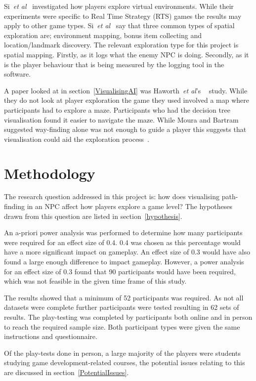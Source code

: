 \documentclass[journal]{IEEEtran}
\begin{document}
	Si~\textit{et al}~\cite{si2017} investigated how players explore virtual environments. While their experiments were specific to Real Time Strategy (RTS) games the results may apply to other game types. Si~\textit{et al}~\cite{si2017} say that three common types of spatial exploration are; environment mapping, bonus item collecting and location/landmark discovery. The relevant exploration type for this project is spatial mapping. Firstly, as it logs what the enemy NPC is doing.  Secondly, as it is the player behaviour that is being measured by the logging tool in the software.
	
	A paper looked at in section~\ref{VisualisingAI} was Haworth~\textit{et al}'s ~\cite{Haworth2010} study. While they do not look at player exploration the game they used involved a map where participants had to explore a maze. Participants who had the decision tree visualisation found it easier to navigate the maze. While Moura and Bartram~\cite{moura2014} suggested way-finding alone was not enough to guide a player this suggests that visualisation could aid the exploration process~\cite{Haworth2010}.
	
	\section{Methodology} \label{methodology}
	The research question addressed in this project is: how does visualising path-finding in an NPC affect how players explore a game level? The hypotheses drawn from this question are listed in section~\ref{hypothesis}.  
	
	An a-priori power analysis was performed to determine how many participants were required for an effect size of 0.4. 0.4 was chosen as this percentage would have a more significant impact on gameplay.  An effect size of 0.3 would have also found a large enough difference to impact gameplay. However, a power analysis for an effect size of 0.3 found that 90 participants would have been required, which was not feasible in the given time frame of this study.
	
	The results showed that a minimum of 52 participants was required. As not all datasets were complete further participants were tested resulting in 62 sets of results. The play-testing was completed by participants both online and in person to reach the required sample size. Both participant types were given the same instructions and questionnaire. 
	
	Of the play-tests done in person, a large majority of the players were students studying game development-related courses, the potential issues relating to this are discussed in section~\ref{PotentialIssues}. 
	
\end{document}
